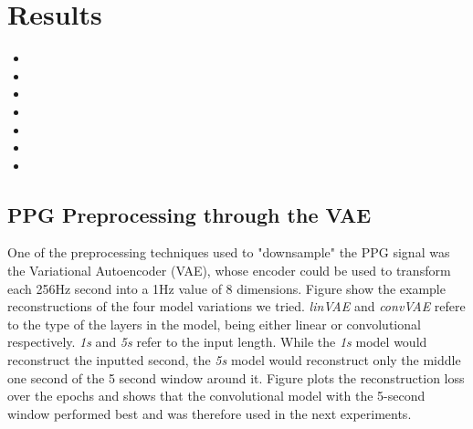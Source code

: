 \chapter{Results \label{Chapter-Results}}

\begin{itemize}
    \item {} %
    \item {} %
    \item {} %
    \item {} %
    \item {} %
    \item {} %
    \item {}
\end{itemize}


\section{PPG Preprocessing through the VAE}

One of the preprocessing techniques used to "downsample" the PPG signal was the Variational Autoencoder (VAE), whose encoder could be used to transform each 256Hz second into a 1Hz value of 8 dimensions. Figure  show the example reconstructions of the four model variations we tried. \textit{linVAE} and \textit{convVAE} refere to the type of the layers in the model, being either linear or convolutional respectively. \textit{1s} and \textit{5s} refer to the input length. While the \textit{1s} model would reconstruct the inputted second, the \textit{5s} model would reconstruct only the middle one second of the 5 second window around it. Figure  plots the reconstruction loss over the epochs and shows that the convolutional model with the 5-second window performed best and was therefore used in the next experiments. 

